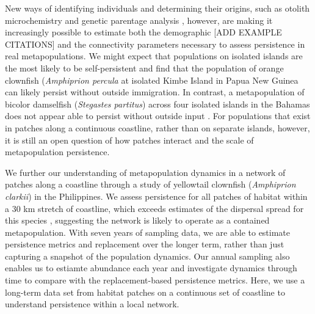 \documentclass[12pt, oneside]{article}   	%
\begin{document}
New ways of identifying individuals and determining their origins, such as otolith microchemistry and genetic parentage analysis \citep[e.g.][]{wang2004sibship, wang2014estimation}, however, are making it increasingly possible to estimate both the demographic [ADD EXAMPLE CITATIONS] and the connectivity \citep[e.g.][]{hameed2016inverse, almany2017larval} parameters necessary to assess persistence in real metapopulations. We might expect that populations on isolated islands are the most likely to be self-persistent and \cite{salles_coral_2015} find that the population of orange clownfish (\textit{Amphiprion percula} at isolated Kimbe Island in Papua New Guinea can likely persist without outside immigration. In contrast, a metapopulation of bicolor damselfish (\textit{Stegastes partitus}) across four isolated islands in the Bahamas does not appear able to persist without outside input \citep{johnson2018integrating}. For populations that exist in patches along a continuous coastline, rather than on separate islands, however, it is still an open question of how patches interact and the scale of metapopulation persistence.

We further our understanding of metapopulation dynamics in a network of patches along a coastline through a study of yellowtail clownfish (\textit{Amphiprion clarkii}) in the Philippines. We assess persistence for all patches of habitat within a 30 km stretch of coastline, which exceeds estimates of the dispersal spread for this species \citep{pinsky2010using}, suggesting the network is likely to operate as a contained metapopulation. With seven years of sampling data, we are able to estimate persistence metrics and replacement over the longer term, rather than just capturing a snapshot of the population dynamics. Our annual sampling also enables us to estiamte abundance each year and investigate dynamics through time to compare with the replacement-based persistence metrics. Here, we use a long-term data set from habitat patches on a continuous set of coastline to understand persistence within a local network. %

\end{document}
